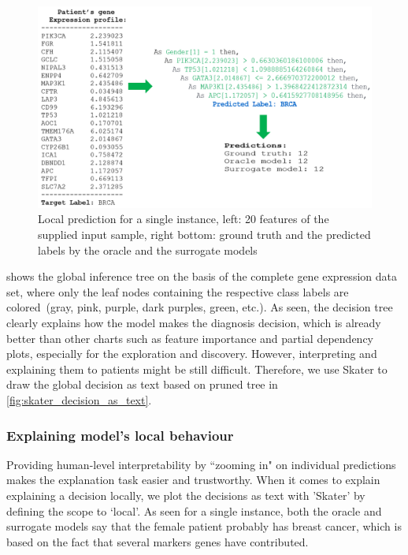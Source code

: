 \begin{figure}[h]
	\centering
		\includegraphics[scale=0.9]{images/single_pred_feature.png}
	    \caption[Local prediction for a single instance.]{Local prediction for a single instance, left: 20 features of the supplied input sample, right bottom: ground truth and the predicted labels by the oracle and the surrogate models}
	    \label{fig:decision_as_text_local_1}
\end{figure}

\hspace*{3.5mm}  shows the global inference tree on the basis of the complete gene expression data set, where only the leaf nodes containing the respective class labels are colored~(gray, pink, purple, dark purples, green, etc.). As seen, the decision tree clearly explains how the model makes the diagnosis decision, which is already better than other charts such as feature importance and partial dependency plots, especially for the exploration and discovery. However, interpreting and explaining them to patients might be still difficult. Therefore, we use Skater to draw the global decision as text based on pruned tree in \cref{fig:skater_decision_as_text}. %

\subsubsection{Explaining model's local behaviour}
Providing human-level interpretability by ``zooming in" on individual predictions makes the explanation task easier and trustworthy\cite{ribeiro2018anchors}. When it comes to explain explaining a decision locally, we plot the decisions as text with 'Skater' by defining the scope to `local'. As seen for a single instance, both the oracle and surrogate models say that the female patient probably has breast cancer, which is based on the fact that several markers genes have contributed. 


